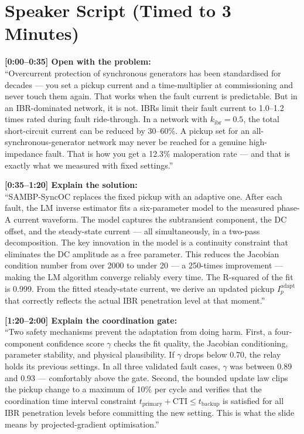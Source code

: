 \documentclass[12pt,a4paper]{article}
\begin{document}
\section{Speaker Script (Timed to 3 Minutes)}

\begin{speakbox}
\textbf{[0:00--0:35] Open with the problem:}\\
``Overcurrent protection of synchronous generators has been standardised for decades --- you set a pickup current and a time-multiplier at commissioning and never touch them again. That works when the fault current is predictable. But in an IBR-dominated network, it is not. IBRs limit their fault current to 1.0--1.2 times rated during fault ride-through. In a network with $k_\mathrm{ibr} = 0.5$, the total short-circuit current can be reduced by 30--60\%. A pickup set for an all-synchronous-generator network may never be reached for a genuine high-impedance fault. That is how you get a 12.3\% maloperation rate --- and that is exactly what we measured with fixed settings.''

\textbf{[0:35--1:20] Explain the solution:}\\
``SAMBP-SyncOC replaces the fixed pickup with an adaptive one. After each fault, the LM inverse estimator fits a six-parameter model to the measured phase-A current waveform. The model captures the subtransient component, the DC offset, and the steady-state current --- all simultaneously, in a two-pass decomposition. The key innovation in the model is a continuity constraint that eliminates the DC amplitude as a free parameter. This reduces the Jacobian condition number from over 2000 to under 20 --- a 250-times improvement --- making the LM algorithm converge reliably every time. The R-squared of the fit is 0.999. From the fitted steady-state current, we derive an updated pickup $I_p^\mathrm{adapt}$ that correctly reflects the actual IBR penetration level at that moment.''

\textbf{[1:20--2:00] Explain the coordination gate:}\\
``Two safety mechanisms prevent the adaptation from doing harm. First, a four-component confidence score $\gamma$ checks the fit quality, the Jacobian conditioning, parameter stability, and physical plausibility. If $\gamma$ drops below 0.70, the relay holds its previous settings. In all three validated fault cases, $\gamma$ was between 0.89 and 0.93 --- comfortably above the gate. Second, the bounded update law clips the pickup change to a maximum of 10\% per cycle and verifies that the coordination time interval constraint $t_\mathrm{primary} + \mathrm{CTI} \leq t_\mathrm{backup}$ is satisfied for all IBR penetration levels before committing the new setting. This is what the slide means by projected-gradient optimisation.''


\end{speakbox}
\end{document}
